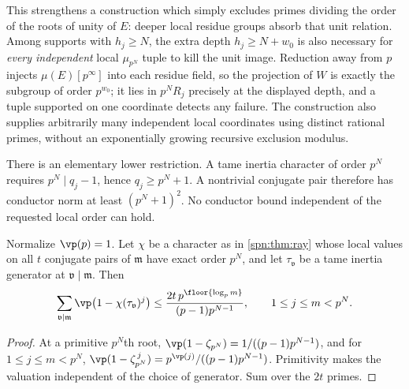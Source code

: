 This strengthens a construction which simply excludes primes dividing the
order of the roots of unity of $E$: deeper local residue groups absorb that
unit relation. Among supports with $h_j\ge N$, the extra depth
$h_j\ge N+w_0$ is also necessary for \emph{every independent} local
$\mu_{p^N}$ tuple to kill the unit image. Reduction away from $p$ injects
$\mu(E)[p^\infty]$ into each residue field, so the projection of $W$ is
exactly the subgroup of order $p^{w_0}$; it lies in $p^NR_j$ precisely at the
displayed depth, and a tuple supported on one coordinate detects any failure.
The construction also supplies arbitrarily many independent local coordinates
using distinct rational primes, without an exponentially growing recursive
exclusion modulus.

There is an elementary lower restriction. A tame inertia character of order
$p^N$ requires $p^N\mid q_j-1$, hence $q_j\ge p^N+1$. A nontrivial conjugate
pair therefore has conductor norm at least $(p^N+1)^2$. No conductor bound
independent of the requested local order can hold.

\begin{lemma}\label{spn:lem:tame-cost}
Normalize $\vp(p)=1$. Let $\chi$ be a character as in \cref{spn:thm:ray}
whose local values on all $t$ conjugate pairs of $\mathfrak m$ have exact
order $p^N$, and let $\tau_{\mathfrak v}$ be a tame inertia generator at
$\mathfrak v\mid\mathfrak m$. Then
\[
 \sum_{\mathfrak v\mid\mathfrak m}\vp\bigl(1-\chi(\tau_{\mathfrak v})^j\bigr)
 \le\frac{2t\,p^{\floor{\log_pm}}}{(p-1)p^{N-1}},\qquad1\le j\le m<p^N .
\]
\end{lemma}

\begin{proof}
At a primitive $p^N$th root, $\vp(1-\zeta_{p^N})=1/((p-1)p^{N-1})$, and for
$1\le j\le m<p^N$,
$\vp(1-\zeta_{p^N}^{\,j})=p^{\vp(j)}/((p-1)p^{N-1})$. Primitivity makes the
valuation independent of the choice of generator. Sum over the $2t$ primes.
\end{proof}

